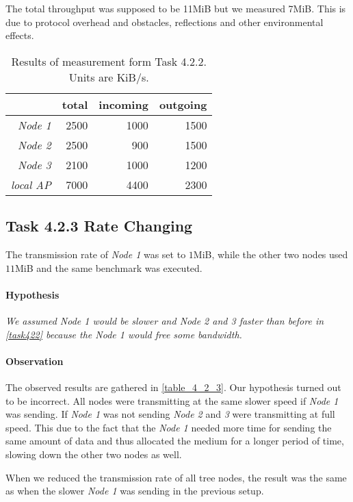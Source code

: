 \documentclass[12pt,a4paper]{article}
\begin{document}
The total throughput was supposed to be 11MiB but we measured 7MiB. This is due to protocol overhead and obstacles, reflections and other environmental effects.
	\begin{table}
	\begin{center}
		\begin{tabular}{r|r|r|r}\
		 & total & incoming & outgoing \\
		 \hline 
		 \emph{Node 1} & 2500 & 1000 & 1500 \\
		 \emph{Node 2} & 2500 & 900 & 1500 \\
		 \emph{Node 3} & 2100 & 1000 & 1200 \\
		 \emph{local AP} & 7000 & 4400& 2300\\
		\end{tabular}
		
		\caption{Results of measurement form Task 4.2.2. Units are KiB/s.}
		\label{table_4_2_2}
	\end{center}
	\end{table}


\subsection{Task 4.2.3 Rate Changing}
The transmission rate of \emph{Node 1} was set to $1$MiB, while the other two nodes used $11$MiB and the same benchmark was executed.

\paragraph{Hypothesis}
\emph{We assumed \emph{Node 1} would be slower and \emph{Node 2} and \emph{3} faster than before in \autoref{task422} because the \emph{Node 1} would free some bandwidth.}

\paragraph{Observation}
The observed results are gathered in \autoref{table_4_2_3}.
Our hypothesis turned out to be incorrect.
All nodes were transmitting at the same slower speed if \emph{Node 1} was sending.
If \emph{Node 1} was not sending \emph{Node 2} and \emph{3} were transmitting at full speed.
This due to the fact that the \emph{Node 1} needed more time for sending the same amount of data and thus allocated the medium for a longer period of time, slowing down the other two nodes as well.

When we reduced the transmission rate of all tree nodes, the result was the same as when the slower \emph{Node 1} was sending in the previous setup.
\end{document}
